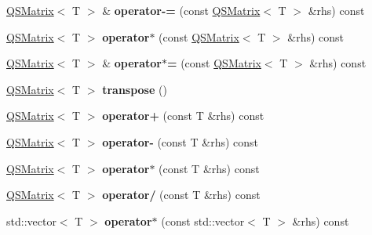 \begin{DoxyCompactItemize}
\item 
\mbox{\label{classQSMatrix_a7c7990ef216782644d00e11d2dbfcaf6}} 
\hyperlink{classQSMatrix}{Q\+S\+Matrix}$<$ T $>$ \& {\bfseries operator-\/=} (const \hyperlink{classQSMatrix}{Q\+S\+Matrix}$<$ T $>$ \&rhs) const
\item 
\mbox{\label{classQSMatrix_a68ae7739eca3c2f32692874bac852d65}} 
\hyperlink{classQSMatrix}{Q\+S\+Matrix}$<$ T $>$ {\bfseries operator$\ast$} (const \hyperlink{classQSMatrix}{Q\+S\+Matrix}$<$ T $>$ \&rhs) const
\item 
\mbox{\label{classQSMatrix_a44c90b19f63d55bd02772a89e27d8e2a}} 
\hyperlink{classQSMatrix}{Q\+S\+Matrix}$<$ T $>$ \& {\bfseries operator$\ast$=} (const \hyperlink{classQSMatrix}{Q\+S\+Matrix}$<$ T $>$ \&rhs) const
\item 
\mbox{\label{classQSMatrix_a4d3e92738a946d232e57dd276b5dc5e6}} 
\hyperlink{classQSMatrix}{Q\+S\+Matrix}$<$ T $>$ {\bfseries transpose} ()
\item 
\mbox{\label{classQSMatrix_a296f8ccd5a968489a7cfcba96f35b4ad}} 
\hyperlink{classQSMatrix}{Q\+S\+Matrix}$<$ T $>$ {\bfseries operator+} (const T \&rhs) const
\item 
\mbox{\label{classQSMatrix_a696e530f2e7d602e92f62fecc0c8fef7}} 
\hyperlink{classQSMatrix}{Q\+S\+Matrix}$<$ T $>$ {\bfseries operator-\/} (const T \&rhs) const
\item 
\mbox{\label{classQSMatrix_ad3147f460074f273f78640182b062e46}} 
\hyperlink{classQSMatrix}{Q\+S\+Matrix}$<$ T $>$ {\bfseries operator$\ast$} (const T \&rhs) const
\item 
\mbox{\label{classQSMatrix_aa8700fcb4023d21639ead8b5f85d0390}} 
\hyperlink{classQSMatrix}{Q\+S\+Matrix}$<$ T $>$ {\bfseries operator/} (const T \&rhs) const
\item 
\mbox{\label{classQSMatrix_a032a8d1fe9c3ee954b4ab6dd22690bcd}} 
std\+::vector$<$ T $>$ {\bfseries operator$\ast$} (const std\+::vector$<$ T $>$ \&rhs) const
\item 
\mbox{\label{classQSMatrix_ab67189ef45049488de149a1e618455e7}} 

\end{DoxyCompactItemize}

